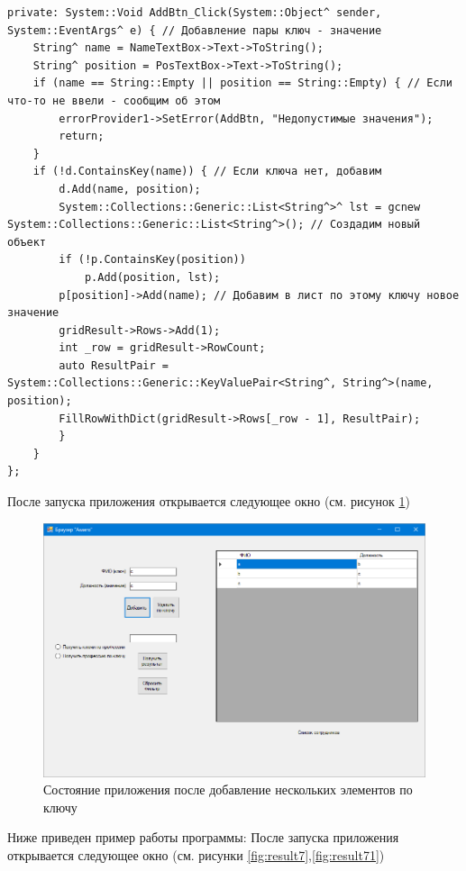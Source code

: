 \begin{verbatim}
private: System::Void AddBtn_Click(System::Object^ sender, System::EventArgs^ e) { // Добавление пары ключ - значение
	String^ name = NameTextBox->Text->ToString();
	String^ position = PosTextBox->Text->ToString();
	if (name == String::Empty || position == String::Empty) { // Если что-то не ввели - сообщим об этом
		errorProvider1->SetError(AddBtn, "Недопустимые значения");
		return;
	}
	if (!d.ContainsKey(name)) { // Если ключа нет, добавим
		d.Add(name, position);
		System::Collections::Generic::List<String^>^ lst = gcnew System::Collections::Generic::List<String^>(); // Создадим новый объект
		if (!p.ContainsKey(position)) 
			p.Add(position, lst);
		p[position]->Add(name); // Добавим в лист по этому ключу новое значение
		gridResult->Rows->Add(1);
		int _row = gridResult->RowCount;
		auto ResultPair = System::Collections::Generic::KeyValuePair<String^, String^>(name, position);
		FillRowWithDict(gridResult->Rows[_row - 1], ResultPair);
		}	
	}
};
\end{verbatim}
После запуска приложения открывается следующее окно (см. рисунок \ref{fig:exec7})
\begin{figure}[H]
    \centering
    \includegraphics[scale=0.4]{task7/result3.png}
    \caption{Состояние приложения после добавление нескольких элементов по ключу}
    \label{fig:exec7}
\end{figure}
Ниже приведен пример работы программы:
После запуска приложения открывается следующее окно (см. рисунки \ref{fig:result7},\ref{fig:result71})

